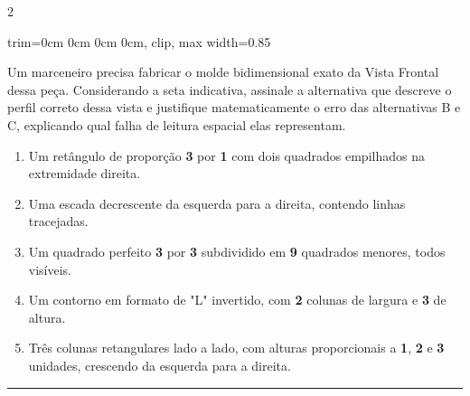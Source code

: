 \documentclass[twoside, 10pt, a4paper]{article}
\newlength{\espacoPreQuestao}\setlength{\espacoPreQuestao}{0.1cm}
\newlength{\espacoQuestao}\setlength{\espacoQuestao}{0.2cm}
\newlength{\espacoAlt}\setlength{\espacoAlt}{0.2cm}
\newcommand{\larguraTikz}{0.85\linewidth}
\begin{document}
\begin{multicols*}{2}
\begin{center}
\begin{adjustbox}{trim=0cm 0cm 0cm 0cm, clip, max width=\larguraTikz}
\end{adjustbox}
\end{center}
Um marceneiro precisa fabricar o molde bidimensional exato da Vista Frontal dessa peça. Considerando a seta indicativa, assinale a alternativa que descreve o perfil correto dessa vista e justifique matematicamente o erro das alternativas B e C, explicando qual falha de leitura espacial elas representam.
\begin{enumerate}[label=\alph*), itemsep=\espacoAlt]
\item Um retângulo de proporção \textbf{3} por \textbf{1} com dois quadrados empilhados na extremidade direita.
\item Uma escada decrescente da esquerda para a direita, contendo linhas tracejadas.
\item Um quadrado perfeito \textbf{3} por \textbf{3} subdividido em \textbf{9} quadrados menores, todos visíveis.
\item Um contorno em formato de "L" invertido, com \textbf{2} colunas de largura e \textbf{3} de altura.
\item Três colunas retangulares lado a lado, com alturas proporcionais a \textbf{1}, \textbf{2} e \textbf{3} unidades, crescendo da esquerda para a direita.
\end{enumerate}
\par\vspace{\espacoQuestao}

\noindent\textcolor{CorLinha}{\rule{\linewidth}{0.5pt}} 
\par\vspace{\espacoPreQuestao}

\end{multicols*}
\end{document}
